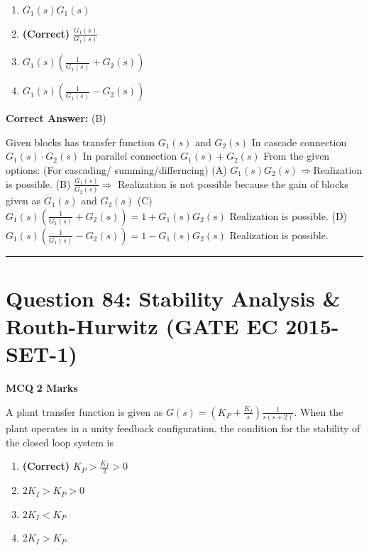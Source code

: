 \documentclass[11pt,a4paper]{article}
\begin{document}
\begin{enumerate}[label=(\Alph*)]
    \item ${G_{1}(s)}{G_{1}(s)}$
    \item \textbf{(Correct)} $\frac{G_{1}(s)}{G_{1}(s)}$
    \item $G_{1}(s)(\frac{1}{G_{1}(s)}+G_{2}(s))$
    \item $G_{1}(s)(\frac{1}{G_{1}(s)}-G_{2}(s))$
\end{enumerate}

\noindent \textbf{Correct Answer:} (B)

\begin{tcolorbox}[solbox, title=Detailed Solution -- Question 83]
Given blocks has transfer function $G_{1}(s)$ and $G_{2}(s)$
 In cascade connection $G_{1}(s) \cdot G_{2}(s)$
 In parallel connection $G_{1}(s)+G_{2}(s)$
 From the given options:
 (For cascading/ summing/differncing)
 (A) $G_{1}(s) G_{2}(s) \Rightarrow$Realization is possible.
 (B) $\frac{G_{1}(s)}{G_{2}(s)} \Rightarrow$ Realization is not possible because 
 the gain of blocks given as $G_{1}(s)$ and $G_{2}(s)$
 (C) $G_{1}(s)\left(\frac{1}{G_{1}(s)}+G_{2}(s)\right)=1+G_{1}(s) G_{2}(s)$
 Realization is possible.
 (D) $G_{1}(s)\left(\frac{1}{G_{1}(s)}-G_{2}(s)\right)=1-G_{1}(s) G_{2}(s)$
 Realization is possible.
\end{tcolorbox}

\vspace{1.5em}
\hrule
\vspace{1.5em}

\section*{Question 84: Stability Analysis \& Routh-Hurwitz (GATE EC 2015-SET-1)}
\noindent \textbf{\color{primary}MCQ} \hfill \textbf{\color{secondary}2 Marks}


\noindent A plant transfer function is given as $G(s)=(K_{P}+\frac{K_{I}}{s})\frac{1}{s(s+2)}$. When the plant operates in a unity feedback configuration, the condition for the stability of the closed loop system is


\begin{enumerate}[label=(\Alph*)]
    \item \textbf{(Correct)} $K_{P}> \frac{K_{I}}{2} >  0$
    \item $2K_{I}> K_{P} > 0$
    \item $2K_{I} < K_{P}$
    \item $2K_{I} > K_{P}$
\end{enumerate}
\end{document}
